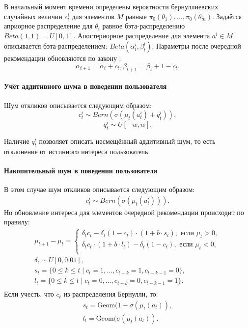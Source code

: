 \documentclass[12pt, twoside]{article}
\begin{document}
В начальный момент времени определены вероятности бернуллиевских случайных величин $c_t^i$ для элементов $M$ равные $\pi_0(\theta_1), \dots, \pi_0(\theta_m)$. 
Задаётся априорное распределение для $\theta_i$ равное бэта-распределению $Beta(1, 1) = U[0, 1]$. 
Апостериорное распределение для элемента $a^i \in M$ описывается бэта-распределением: $Beta(\alpha_t^i, \beta_t^i)$. 
Параметры после очередной рекомендации обновляются по закону :
\begin{equation}\label{eq3}
\alpha_{t+1} = \alpha_t + c_t, \beta_{t+1} = \beta_t + 1 - c_t.
\end{equation}

\paragraph{Учёт аддитивного шума в поведении пользователя}
Шум откликов описываeтся следующим образом: 
\begin{equation}\label{eq4}
  c_t^i \sim Bern \left(\sigma(\mu_t(a_t^i) + q_t^i) \right),
\end{equation}
\begin{equation}
  q_t^i \sim U[-w, w].
\end{equation}

Наличие $q_t^i$ позволяет описать несмещённый аддитивный шум, то есть отклонение от истинного интереса пользователь. 

\paragraph{Накопительный шум в поведении пользователя}
В этом случае шум откликов описываeтся следующим образом: 
\begin{gather*}
  c_t^i \sim Bern \left(\sigma(\mu_t(a_t^i)) \right).
\end{gather*}
Но обновление интереса для элементов очередной рекомендации происходит по правилу: 
\begin{gather*}  
  \mu_{t+1} - \mu_{t} = 
  \begin{cases} 
    \delta_t c_t  - \delta_t (1 - c_t) \cdot (1 + b \cdot s_t), \text{ если } \mu_t > 0, \\
    \delta_t c_t \cdot (1 + b \cdot l_t) - \delta_t (1 - c_t), \text{ если } \mu_t < 0, \\
  \end{cases} \\
  \delta_t \sim U[0, 0.01], \\
  s_t = \{0 \leq k \leq t \mid c_{t} = 1, \dots, c_{t-k} = 1, c_{t-k-1} = 0 \},\\
  l_t = \{0 \leq k \leq t \mid c_{t} = 0, \dots, c_{t-k} = 0, c_{t-k-1} = 1 \}.\\
\end{gather*}
Если учесть, что $c_t$ из распределения Бернулли, то: 
\begin{gather*}
  s_t = \text{Geom}(1 - \sigma(\mu_t(a_t)), \\
  l_t = \text{Geom}(\sigma(\mu_t(a_t)). 
\end{gather*}
\end{document}

